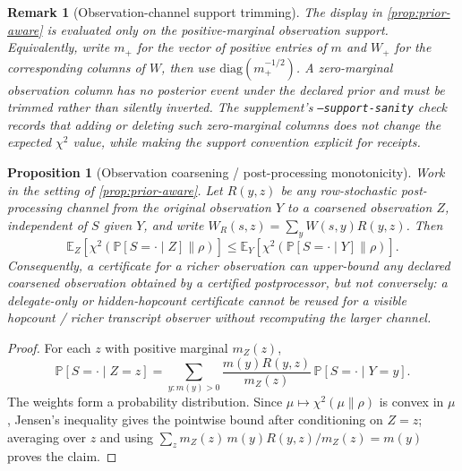 \documentclass[11pt]{article}
\newtheorem{proposition}[theorem]{Proposition}
\newtheorem{remark}[theorem]{Remark}
\newcommand{\E}{\mathbb{E}}
\newcommand{\Prb}{\mathbb{P}}
\begin{document}
\begin{remark}[Observation-channel support trimming]\label{rem:support-trim}
The display in \cref{prop:prior-aware} is evaluated only on the
positive-marginal observation support.  Equivalently, write $m_+$ for the vector
of positive entries of $m$ and $W_+$ for the corresponding columns of $W$, then
use $\mathrm{diag}(m_+^{-1/2})$.  A zero-marginal observation column has no
posterior event under the declared prior and must be trimmed rather than silently
inverted.  The supplement's \texttt{--support-sanity} check records that adding
or deleting such zero-marginal columns does not change the expected $\chi^2$
value, while making the support convention explicit for receipts.
\end{remark}


\begin{proposition}[Observation coarsening / post-processing monotonicity]\label{prop:postprocess}
Work in the setting of \cref{prop:prior-aware}.  Let $R(y,z)$ be any
row-stochastic post-processing channel from the original observation $Y$ to a
coarsened observation $Z$, independent of $S$ given $Y$, and write
$W_R(s,z)=\sum_y W(s,y)R(y,z)$.  Then
\[
\E_Z\!\left[\chi^2(\Prb[S=\cdot\mid Z]\|\rho)\right]
\le
\E_Y\!\left[\chi^2(\Prb[S=\cdot\mid Y]\|\rho)\right].
\]
Consequently, a certificate for a richer observation can upper-bound any declared
coarsened observation obtained by a certified postprocessor, but not conversely:
a delegate-only or hidden-hopcount certificate cannot be reused for a visible
hopcount / richer transcript observer without recomputing the larger channel.
\end{proposition}
\begin{proof}
For each $z$ with positive marginal $m_Z(z)$,
\[
\Prb[S=\cdot\mid Z=z]
=\sum_{y:m(y)>0}\frac{m(y)R(y,z)}{m_Z(z)}\,\Prb[S=\cdot\mid Y=y].
\]
The weights form a probability distribution.  Since
$\mu\mapsto\chi^2(\mu\|\rho)$ is convex in $\mu$, Jensen's inequality gives the
pointwise bound after conditioning on $Z=z$; averaging over $z$ and using
$\sum_z m_Z(z)\,m(y)R(y,z)/m_Z(z)=m(y)$ proves the claim.
\end{proof}
\end{document}
